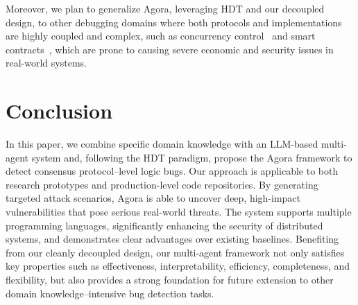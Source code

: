 \documentclass{article}
\theoremstyle{plain}
\theoremstyle{definition}
\theoremstyle{remark}
\newcommand{\consensustester}{Agora\xspace}
\begin{document}
Moreover, we plan to generalize \consensustester, leveraging HDT and our decoupled design, to other debugging domains where both protocols and implementations are highly coupled and complex, such as concurrency control~\cite{Tan2020CobraMT,Clark2024ValidatingDS} and smart contracts~\cite{Sun2024GPTScanDL}, which are prone to causing severe economic and security issues in real-world systems.


\section{Conclusion}
\label{sec:conclusion}


In this paper, we combine specific domain knowledge with an LLM-based multi-agent system and, following the HDT paradigm, propose the \consensustester framework to detect consensus protocol–level logic bugs. Our approach is applicable to both research prototypes and production-level code repositories. By generating targeted attack scenarios, \consensustester is able to uncover deep, high-impact vulnerabilities that pose serious real-world threats. The system supports multiple programming languages, significantly enhancing the security of distributed systems, and demonstrates clear advantages over existing baselines.
Benefiting from our cleanly decoupled design, our multi-agent framework not only satisfies key properties such as effectiveness, interpretability, efficiency, completeness, and flexibility, but also provides a strong foundation for future extension to other domain knowledge–intensive bug detection tasks.






\end{document}
